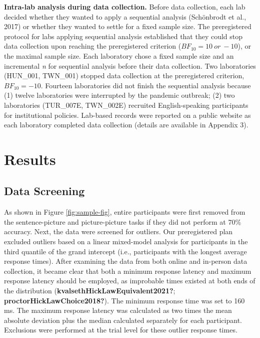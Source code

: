 \documentclass[
  man]{apa7}
\begin{document}
\textbf{Intra-lab analysis during data collection.} Before data collection, each lab decided whether they wanted to apply a sequential analysis (Schönbrodt et al., 2017) or whether they wanted to settle for a fixed sample size. The preregistered protocol for labs applying sequential analysis established that they could stop data collection upon reaching the preregistered criterion (\(BF_{10} = 10\ or\ -10\)), or the maximal sample size. Each laboratory chose a fixed sample size and an incremental \emph{n} for sequential analysis before their data collection. Two laboratories (HUN\_001, TWN\_001) stopped data collection at the preregistered criterion, \(BF_{10} = -10\). Fourteen laboratories did not finish the sequential analysis because (1) twelve laboratories were interrupted by the pandemic outbreak; (2) two laboratories (TUR\_007E, TWN\_002E) recruited English-speaking participants for institutional policies. Lab-based records were reported on a public website as each laboratory completed data collection (details are available in Appendix 3).

\hypertarget{results}{%
\section{Results}\label{results}}

\hypertarget{data-screening}{%
\subsection{Data Screening}\label{data-screening}}

As shown in Figure \ref{fig:sample-fig}, entire participants were first removed from the sentence-picture and picture-picture tasks if they did not perform at 70\% accuracy. Next, the data were screened for outliers. Our preregistered plan excluded outliers based on a linear mixed-model analysis for participants in the third quantile of the grand intercept (i.e., participants with the longest average response times). After examining the data from both online and in-person data collection, it became clear that both a minimum response latency and maximum response latency should be employed, as improbable times existed at both ends of the distribution (\textbf{kvalsethHickLawEquivalent2021?}; \textbf{proctorHickLawChoice2018?}). The minimum response time was set to 160 ms. The maximum response latency was calculated as two times the mean absolute deviation plus the median calculated separately for each participant. Exclusions were performed at the trial level for these outlier response times.
\end{document}
